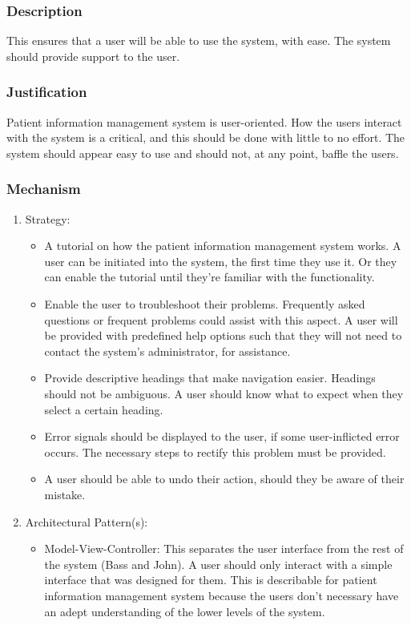 \subsubsection*{Description}
This ensures that a user will be able to use the system, with ease. The system should provide support to the user.
\subsubsection*{Justification}
Patient information management system is user-oriented. How the users interact with the system is a critical, and this should be done with little to no effort. The system should appear easy to use and should not, at any point, baffle the users. 
\subsubsection*{Mechanism}
	\begin{enumerate}
		\item Strategy:
		
		 	\begin{itemize}
		 	\item A tutorial on how the patient information management system works. A user can be initiated into the system, the 					  first time they use it. Or they can enable the tutorial until they're familiar with the functionality.
		 	\item Enable the user to troubleshoot their problems. Frequently asked questions or frequent problems could assist 						with this aspect.  A user will be provided with predefined help options such that they will not need to contact 					the system's administrator, for assistance.
		 	\item Provide descriptive headings that make navigation easier. Headings should not be ambiguous. A user should 						  know what to expect when they select a certain heading.
		 	\item Error signals should be displayed to the user, if some user-inflicted error occurs. The necessary steps to 		                  rectify this problem must be provided.
		 	\item A user should be able to undo their action, should they be aware of their mistake.
		 	\end{itemize}
		 	
			\item Architectural Pattern(s):
		
			\begin{itemize}
			\item Model-View-Controller: This separates the user interface from the rest of the system (Bass and John). A user should only interact with a simple interface that was designed for them. This is describable for patient information management system because the users don't necessary have an adept understanding of the lower   levels of the system.
			\end{itemize}
	\end{enumerate}